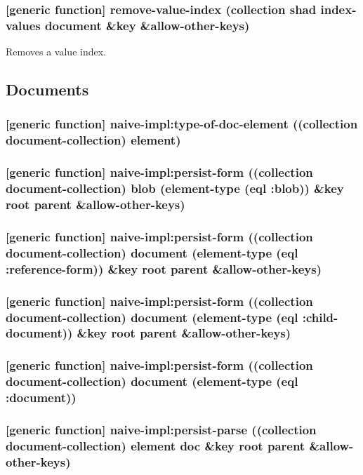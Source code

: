 \documentclass[11pt]{article}
\begin{document}
\subsubsection{[generic function] remove-value-index (collection shad index-values document \&key \&allow-other-keys)}
\label{sec:org994f80c}

Removes a value index.

\subsection{Documents}
\label{sec:org21e3f6d}

\subsubsection{[generic function] naive-impl:type-of-doc-element ((collection document-collection) element)}
\label{sec:org6e2d387}

\subsubsection{[generic function] naive-impl:persist-form ((collection document-collection) blob (element-type (eql :blob))			 \&key root parent \&allow-other-keys)}
\label{sec:org0a7dd2f}

\subsubsection{[generic function] naive-impl:persist-form ((collection document-collection) document (element-type (eql :reference-form)) \&key root parent \&allow-other-keys)}
\label{sec:org6fb5619}

\subsubsection{[generic function] naive-impl:persist-form ((collection document-collection) document (element-type (eql :child-document)) \&key root parent \&allow-other-keys)}
\label{sec:orgf8f4835}

\subsubsection{[generic function] naive-impl:persist-form ((collection document-collection) document (element-type (eql :document))}
\label{sec:orgb68b3e8}

\subsubsection{[generic function] naive-impl:persist-parse ((collection document-collection) element doc \&key root parent \&allow-other-keys)}
\label{sec:org064234e}
\end{document}
